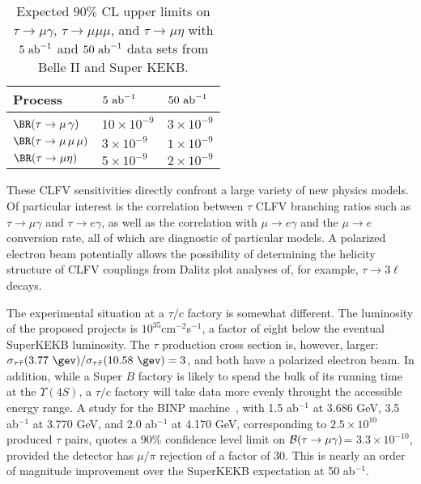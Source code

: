 \begin{table}[!b]
  \caption{
    \label{tab:LFVExptSensitivities-BelleII}
    Expected $90\%$ CL upper limits
    on $\tau\to\mu\gamma$, $\tau\to \mu\mu\mu$, and $\tau\to \mu\eta$
    with $5 \ {\rm ab}^{-1}$ and  $50 \ {\rm ab}^{-1}$ data sets from Belle II and  Super KEKB.
  }
  \begin{center}
    \begin{tabular}{lll}
      \hline \hline
Process & $5\ {\rm ab}^{-1}$ & $50\ {\rm ab}^{-1}$  \\
      \hline
      $\BR(\tau \to \mu\,\gamma) \rule{0pt}{2.6ex}$ &  $10 \times 10^{-9}$ &  $3 \times 10^{-9}$  \\
      $\BR(\tau \to \mu\, \mu\, \mu)$ &  $3 \times 10^{-9}$ & $1 \times 10^{-9}$  \\
      $\BR(\tau \to \mu \eta)$             &  $5 \times 10^{-9}$ & $2\times 10^{-9}$    \\
 \hline\hline
    \end{tabular}
  \end{center}
\end{table}


These CLFV sensitivities directly confront a large variety of new
physics models. Of particular interest is the correlation between
$\tau$ CLFV branching ratios such as $\tau\to \mu\gamma$ and $\tau\to e
\gamma$, as well as the correlation with $\mu\to e \gamma$ and the
$\mu\to e$ conversion rate, all of which are diagnostic of particular
models.  A polarized electron beam potentially allows the possibility of determining the helicity structure of CLFV couplings from Dalitz plot analyses of, for example, $\tau \to 3\ell$ decays.

The experimental situation at a $\tau/c$ factory is somewhat different. The luminosity of the proposed projects is $10^{35}$cm$^{-2}$s$^{-1}$, a factor of eight below the eventual SuperKEKB luminosity. The $\tau$ production cross section is, however, larger: $\sigma_{\tau\bar{\tau}}(3.77\  \gev)/\sigma_{\tau\bar{\tau}}(10.58\  \gev)=3$, and both have a polarized electron beam. In addition, while a Super $B$ factory is likely to spend the bulk of its running time at the $\Upsilon(4S)$, a $\tau/c$ factory will take data more evenly throught the accessible energy range.  A study for the BINP machine~\cite{bobrov}, with 1.5 ab$^{-1}$ at 3.686 GeV,
3.5 ab$^{-1}$ at 3.770 GeV, and 2.0 ab$^{-1}$ at 4.170 GeV, 
corresponding to  $2.5\times 10^{10}$ produced $\tau$ pairs, quotes a 90\% confidence level limit on $\cal{B}(\tau\rightarrow\mu\gamma)$= $3.3\times 10^{-10}$, provided the detector has $\mu/\pi$ rejection of a factor of 30. This is nearly an order of magnitude improvement over the SuperKEKB expectation at 50 ab$^{-1}$.

